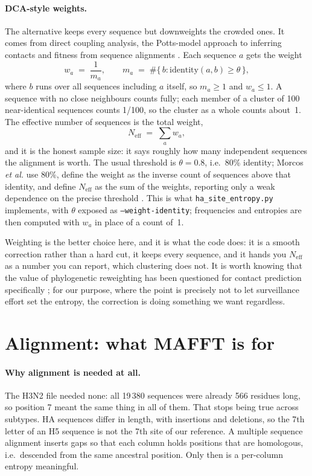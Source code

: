 \documentclass[11pt,a4paper]{article}
\newcommand{\file}[1]{\texttt{#1}}
\newcommand{\Neff}{N_{\mathrm{eff}}}
\begin{document}
\paragraph{DCA-style weights.}
The alternative keeps every sequence but downweights the crowded ones. It comes
from direct coupling analysis, the Potts-model approach to inferring contacts
and fitness from sequence alignments \cite{morcos2011,cocco2018}. Each sequence
$a$ gets the weight
\begin{equation}
  w_a \;=\; \frac{1}{m_a},
  \qquad
  m_a \;=\; \#\{\,b : \mathrm{identity}(a,b) \ge \theta \,\},
  \label{eq:weights}
\end{equation}
where $b$ runs over all sequences including $a$ itself, so $m_a \ge 1$ and
$w_a \le 1$. A sequence with no close neighbours counts fully; each member of a
cluster of 100 near-identical sequences counts 1/100, so the cluster as a whole
counts about~1. The effective number of sequences is the total weight,
\begin{equation}
  \Neff \;=\; \sum_a w_a ,
  \label{eq:neff}
\end{equation}
and it is the honest sample size: it says roughly how many independent sequences
the alignment is worth. The usual threshold is $\theta = 0.8$, i.e.\ 80\%
identity; Morcos \emph{et al.} use 80\%, define the weight as the inverse count
of sequences above that identity, and define $\Neff$ as the sum of the weights,
reporting only a weak dependence on the precise threshold \cite{morcos2011}.
This is what \file{ha\_site\_entropy.py} implements, with $\theta$ exposed as
\file{--weight-identity}; frequencies and entropies are then computed with $w_a$
in place of a count of~1.

Weighting is the better choice here, and it is what the code does: it is a
smooth correction rather than a hard cut, it keeps every sequence, and it hands
you $\Neff$ as a number you can report, which clustering does not. It is worth
knowing that the value of phylogenetic reweighting has been questioned for
contact prediction specifically \cite{hockenberry2019}; for our purpose, where
the point is precisely not to let surveillance effort set the entropy, the
correction is doing something we want regardless.

\section{Alignment: what MAFFT is for}
\label{sec:mafft}

\paragraph{Why alignment is needed at all.}
The H3N2 file needed none: all 19\,380 sequences were already 566 residues long,
so position 7 meant the same thing in all of them. That stops being true across
subtypes. HA sequences differ in length, with insertions and deletions, so the
7th letter of an H5 sequence is not the 7th site of our reference. A multiple
sequence alignment inserts gaps so that each column holds positions that are
homologous, i.e.\ descended from the same ancestral position. Only then is a
per-column entropy meaningful.
\end{document}
